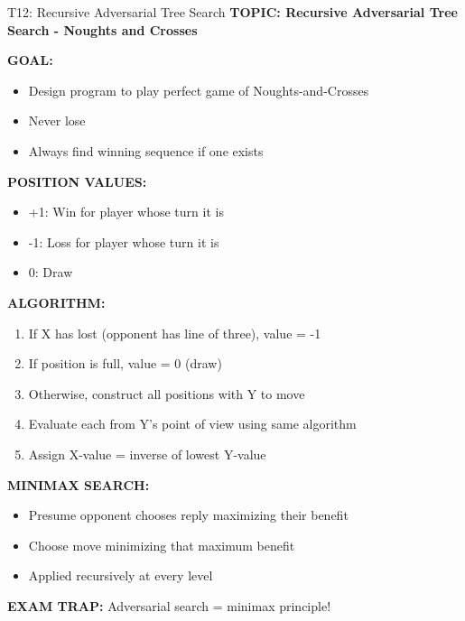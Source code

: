 \documentclass[8pt]{beamer}
\begin{document}
	\begin{frame}{T12: Recursive Adversarial Tree Search}
		\fontsize{6.5}{7.5}\selectfont
		\textbf{TOPIC: Recursive Adversarial Tree Search - Noughts and Crosses}
		
		\vspace{0.1cm}
		\textbf{GOAL:}
		\begin{itemize}
			\item Design program to play perfect game of Noughts-and-Crosses
			\item Never lose
			\item Always find winning sequence if one exists
		\end{itemize}
		
		\vspace{0.1cm}
		\textbf{POSITION VALUES:}
		\begin{itemize}
			\item \textcolor{myblue}{+1:} Win for player whose turn it is
			\item \textcolor{myblue}{-1:} Loss for player whose turn it is
			\item \textcolor{myblue}{0:} Draw
		\end{itemize}
		
		\vspace{0.1cm}
		\textbf{ALGORITHM:}
		\begin{enumerate}
			\item If X has lost (opponent has line of three), value = -1
			\item If position is full, value = 0 (draw)
			\item Otherwise, construct all positions with Y to move
			\item Evaluate each from Y's point of view using same algorithm
			\item Assign X-value = inverse of lowest Y-value
		\end{enumerate}
		
		\vspace{0.1cm}
		\textbf{MINIMAX SEARCH:}
		\begin{itemize}
			\item Presume opponent chooses reply maximizing their benefit
			\item Choose move minimizing that maximum benefit
			\item Applied recursively at every level
		\end{itemize}
		
		\textcolor{myred}{\textbf{EXAM TRAP:}} Adversarial search = \textcolor{myblue}{minimax principle}!
	\end{frame}
	
\end{document}
